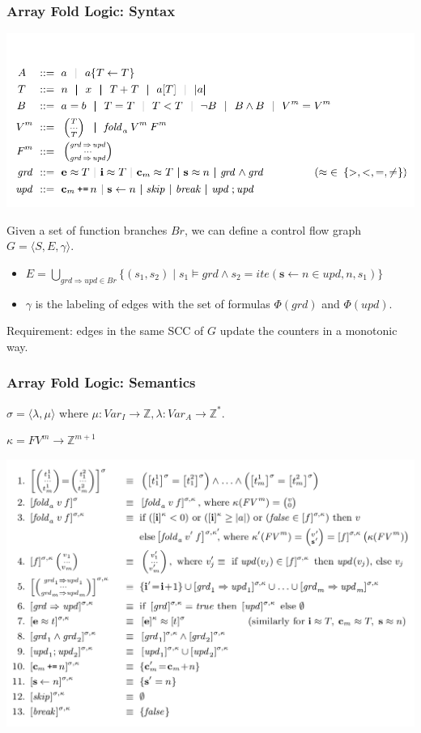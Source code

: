 \documentclass[11pt]{beamer}
\begin{document}
\begin{frame}\frametitle{Array Fold Logic: Syntax}

\begin{center}
\includegraphics[scale=0.32]{aflsyn.png}
\end{center}

Given a set of function branches $Br$, we can define a control flow graph $G =\langle S,E,\gamma \rangle $.
\begin{itemize}
\item $E = \bigcup_{grd\Rightarrow upd \in Br} \{(s_1, s_2)\mid s_1 \models grd\wedge s_2 = ite(\textbf{s}\leftarrow n\in upd, n, s_1)\}$
\item $\gamma$ is the labeling of edges with the set of formulas $\Phi(grd)$ and $\Phi(upd)$.
\end{itemize}
Requirement: edges in the same SCC of $G$ update the counters in a monotonic way.

\end{frame}

\begin{frame}\frametitle{Array Fold Logic: Semantics}
$\sigma = \langle\lambda, \mu\rangle$ where $\mu: Var_{I} \rightarrow \mathbb{Z}, \lambda: Var_{A} \rightarrow \mathbb{Z}^*$.

$\kappa = FV^{m} \rightarrow \mathbb{Z}^{m+1}$
\begin{center}
\includegraphics[scale=0.26]{aflsema.png}
\end{center}

\end{frame}
\end{document}
